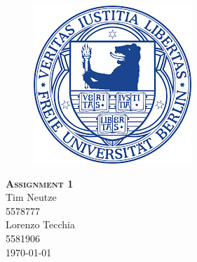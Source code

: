 \documentclass{report}
\begin{document}
\begin{center}
    
\end{center}
    \begin{figure}[htb]
            \centering\includegraphics[width=.5\textwidth]{Immagini/FUlogo.png}
    \end{figure}
    

    \begin{center}
        {\scshape\huge\bfseries Assignment 1}\\
        \LARGE Tim Neutze \\  5578777 \\
        \LARGE Lorenzo Tecchia \\ 5581906 \\ \today
    \end{center}


    \newpage
    
    \tableofcontents
    \listoffigures
    
    
    
    
    
    
    
    \printbibliography
    
\end{document}
